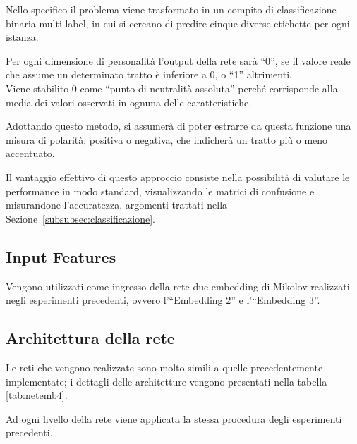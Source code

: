 Nello specifico il problema viene trasformato in un compito di classificazione binaria multi-label, in cui si cercano di predire cinque diverse etichette per ogni istanza. 

Per ogni dimensione di personalità l'output della rete sarà ``0'', se il valore reale che assume un determinato tratto è inferiore a 0, o ``1'' altrimenti.
\\
Viene stabilito 0 come ``punto di neutralità assoluta'' perché corrisponde alla media dei valori osservati in ognuna delle caratteristiche.

Adottando questo metodo, si assumerà di poter estrarre da questa funzione una misura di polarità, positiva o negativa, che indicherà un tratto più o meno accentuato.

Il vantaggio effettivo di questo approccio consiste nella possibilità di valutare le performance in modo standard, visualizzando le matrici di confusione e misurandone l'accuratezza, argomenti trattati nella Sezione~\ref{subsubsec:classificazione}.

\subsection{Input Features}
\label{subsec:features4}

Vengono utilizzati come ingresso della rete due embedding di Mikolov realizzati negli esperimenti precedenti, ovvero l'``Embedding 2'' e l'``Embedding 3''.

\subsection{Architettura della rete}
\label{subsec:modelli4}

Le reti che vengono realizzate sono molto simili a quelle precedentemente implementate; i dettagli delle architetture vengono presentati nella tabella \ref{tab:netemb4}.

Ad ogni livello della rete viene applicata la stessa procedura degli esperimenti precedenti. 

